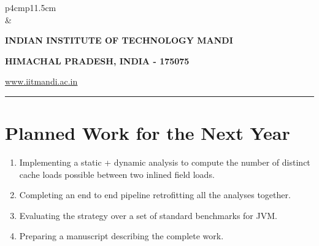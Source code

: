 \documentclass[12 pt, a4paper]{article}
\newcommand{\HRule}{\rule{\linewidth}{1mm}}
\begin{document}
\clearpage




\pagestyle{empty}
\vskip 0.2cm
	\begin{tabular}{p{4cm}p{11.5cm}}
		  \\
		& \centering \large\bf\phantom{Empty line}\\ 
		\rule{0pt}{1pt} \centering \large\bf{INDIAN INSTITUTE OF TECHNOLOGY MANDI} \\
		\rule{0pt}{1pt} \centering \large\bf{HIMACHAL PRADESH, INDIA - 175075} \\
		\rule{0pt}{1pt} \centering \underline{\href{www.iitmandi.ac.in}{www.iitmandi.ac.in}}\\
	\end{tabular}
\noindent

{\raggedleft{}\HRule}
\section{Planned Work for the Next Year}   
 \begin{enumerate}
\item Implementing a static + dynamic analysis to compute the number of distinct
		cache loads possible between two inlined field loads.

\item Completing an end to end pipeline retrofitting all the analyses together.

\item Evaluating the strategy over a set of standard benchmarks for JVM.

\item Preparing a manuscript describing the complete work.
 
\end{enumerate} 
\end{document}
